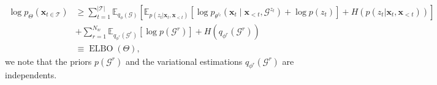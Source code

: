 \begin{equation*}
    \begin{aligned}
    \log p_\Theta\left(\boldsymbol{x}_{t \in \mathcal{T}}\right)& \geq
\sum_{t=1}^{|\mathcal{T}|}\mathbb{E}_{q_\phi\left(\mathcal{G}\right)}\left[\mathbb { E } _ { p( z_t  | \boldsymbol{x}_t, \boldsymbol{x}_{<t}) } \left[\log p_{\theta^{z_t}}\left(\boldsymbol{x}_t\mid \boldsymbol{x}_{<t}, \mathcal{G}^{z_t}\right)+\log p\left(z_t\right)\right] + H\left(p( z_t  | \boldsymbol{x}_t, \boldsymbol{x}_{<t})\right)\right] \\
 &+\sum_{r=1}^{N_w} \mathbb{E}_{q_{\phi^r}\left(\mathcal{G}^r\right)}\left[\log p\left(\mathcal{G}^r\right)\right]+H\left(q_{\phi^r}\left(\mathcal{G}^r\right)\right) \\
 &\equiv \operatorname{ELBO}(\Theta),
     \end{aligned}
\end{equation*}
we note that the priors $p(\mathcal{G}^r)$ and the variational estimations $q_{\phi^r}(\mathcal{G}^r)$ are independents.  